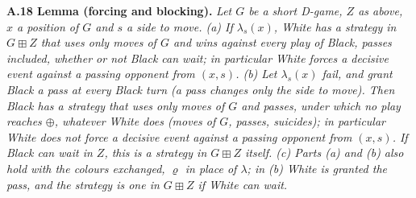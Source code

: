 \textbf{A.18 Lemma (forcing and blocking).} \emph{Let $G$ be a short D-game, $Z$ as above, $x$ a position of $G$ and $s$
a side to move. (a) If $\lambda_s(x)$, White has a strategy in $G\boxplus Z$ that uses only moves of $G$ and wins
against every play of Black, passes included, whether or not Black can wait; in particular White forces a decisive
event against a passing opponent from $(x,s)$. (b) Let $\lambda_s(x)$ fail, and grant Black a pass at every Black turn
(a pass changes only the side to move). Then Black has a strategy that uses only moves of $G$ and passes, under which no
play reaches $\oplus$, whatever White does (moves of $G$, passes, suicides); in particular White does not force a
decisive event against a passing opponent from $(x,s)$. If Black can wait in $Z$, this is a strategy in $G\boxplus Z$
itself. (c) Parts (a) and (b) also hold with the colours exchanged, $\varrho$ in place of $\lambda$; in (b) White is
granted the pass, and the strategy is one in $G\boxplus Z$ if White can wait.}

